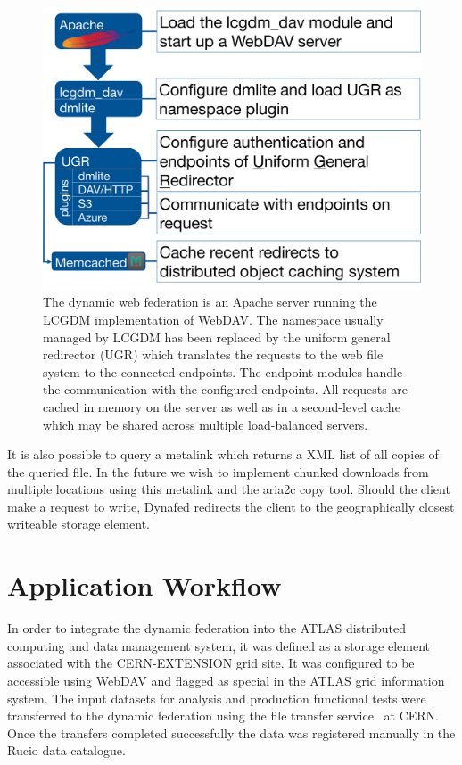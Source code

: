 \documentclass[a4paper]{jpconf}
\begin{document}
\begin{figure}
  \centering
  \includegraphics[width=\textwidth]{dynafed-arch.png}
  \caption{The dynamic web federation is an Apache server running the LCGDM implementation of WebDAV. The namespace usually managed by LCGDM has been replaced by the uniform general redirector (UGR) which translates the requests to the web file system to the connected endpoints. The endpoint modules handle the communication with the configured endpoints. All requests are cached in memory on the server as well as in a second-level cache which may be shared across multiple load-balanced servers.}
  \label{fig:dynafed-arch}
\end{figure}

 It is also possible to query a metalink which returns a XML list of all copies of the queried file. In the future we wish to implement chunked downloads from multiple locations using this metalink and the aria2c copy tool. Should the client make a request to write, Dynafed redirects the client to the geographically closest writeable storage element.


\section{Application Workflow}
In order to integrate the dynamic federation into the ATLAS distributed computing and data management system, it was defined as a storage element associated with the \textrm{CERN-EXTENSION} grid site. It was configured to be accessible using WebDAV and flagged as special in the ATLAS grid information system. %
The input datasets for analysis and production functional tests were transferred to the dynamic federation using the file transfer service~\cite{fts3} at CERN. Once the transfers completed successfully the data was registered manually in the Rucio data catalogue.
\end{document}
